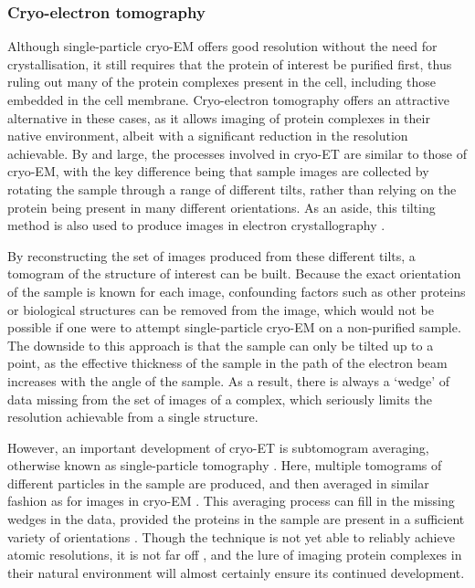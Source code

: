 \documentclass[a4paper,11pt,twoside,openright]{scrbook}
\begin{document}
\subsubsection{Cryo-electron tomography}
Although single-particle cryo-EM offers good resolution without the need for crystallisation, it still requires that the protein of interest be purified first, thus ruling out many of the protein complexes present in the cell, including those embedded in the cell membrane. Cryo-electron tomography offers an attractive alternative in these cases, as it allows imaging of protein complexes in their native environment, albeit with a significant reduction in the resolution achievable. By and large, the processes involved in cryo-ET are similar to those of cryo-EM, with the key difference being that sample images are collected by rotating the sample through a range of different tilts, rather than relying on the protein being present in many different orientations. As an aside, this tilting method is also used to produce images in electron crystallography \cite{Wisedchaisri2011}.

By reconstructing the set of images produced from these different tilts, a tomogram of the structure of interest can be built. Because the exact orientation of the sample is known for each image, confounding factors such as other proteins or biological structures can be removed from the image, which would not be possible if one were to attempt single-particle cryo-EM on a non-purified sample. The downside to this approach is that the sample can only be tilted up to a point, as the effective thickness of the sample in the path of the electron beam increases with the angle of the sample. As a result, there is always a `wedge' of data missing from the set of images of a complex, which seriously limits the resolution achievable from a single structure.

However, an important development of cryo-ET is subtomogram averaging, otherwise known as single-particle tomography \cite{Galaz-Montoya2017}. Here, multiple tomograms of different particles in the sample are produced, and then averaged in similar fashion as for images in cryo-EM \cite{Bharat2016}. This averaging process can fill in the missing wedges in the data, provided the proteins in the sample are present in a sufficient variety of orientations \cite{Leschziner2006}. Though the technique is not yet able to reliably achieve atomic resolutions, it is not far off \cite{Schur2016}, and the lure of imaging protein complexes in their natural environment will almost certainly ensure its continued development.
\end{document}
